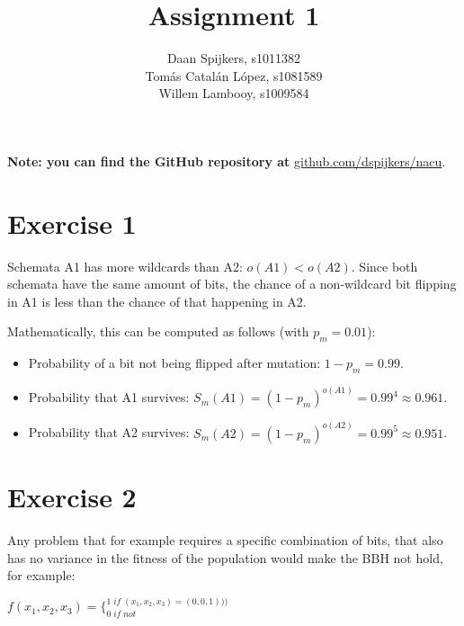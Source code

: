 \documentclass{scrartcl}
\title{Assignment 1}
\author{Daan Spijkers, s1011382\\ Tomás Catalán López, s1081589\\ Willem Lambooy, s1009584}
\begin{document}
\maketitle

\textbf{Note: you can find the GitHub repository at}
\url{github.com/dspijkers/nacu}.

\section*{Exercise 1}
Schemata A1 has more wildcards than A2: $o(A1) < o(A2)$. Since both schemata have the same amount of bits, the chance of a non-wildcard bit flipping in A1 is less than the chance of that happening in A2.

Mathematically, this can be computed as follows (with $p_m=0.01$):
\begin{itemize}
 \item Probability of a bit not being flipped after mutation: $1-p_m=0.99$.
 \item Probability that A1 survives: $S_m(A1)=(1-p_m)^{o(A1)}=0.99^4\approx0.961$.
 \item Probability that A2 survives: $S_m(A2)=(1-p_m)^{o(A2)}=0.99^5\approx0.951$.
\end{itemize}

\section*{Exercise 2}
Any problem that for example requires a specific combination of bits, that also has no variance in the fitness of the population would make the BBH not hold, for example:\\
\begin{center}
$\displaystyle f(x_1,x_2,x_3)=\mathrm{ \{ }
_{0 \; if \; not}
^{1\;if \; (x_1,x_2,x_3)=(0,0,1)))}$
\end{center}
\end{document}
